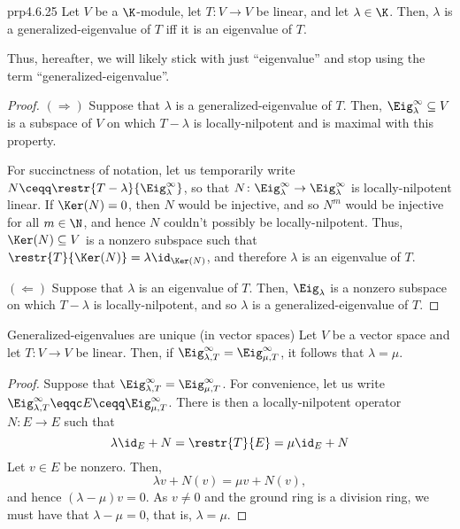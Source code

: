 \begin{prp}{}{prp4.6.25}
	Let $V$ be a $\K$-module, let $T\colon V\rightarrow V$ be linear, and let $\lambda \in \K$.  Then, $\lambda$ is a generalized-eigenvalue of $T$ iff it is an eigenvalue of $T$.
	\begin{rmk}
		Thus, hereafter, we will likely stick with just ``eigenvalue'' and stop using the term ``generalized-eigenvalue''.
	\end{rmk}
	\begin{proof}
		$(\Rightarrow )$ Suppose that $\lambda$ is a generalized-eigenvalue of $T$.  Then, $\Eig _{\lambda}^{\infty}\subseteq V$ is a subspace of $V$ on which $T-\lambda$ is locally-nilpotent and is maximal with this property.
		
		For succinctness of notation, let us temporarily write $N\ceqq \restr{T-\lambda}{\Eig _{\lambda}^{\infty}}$, so that $N\colon \Eig _{\lambda}^{\infty}\rightarrow \Eig _{\lambda}^{\infty}$ is locally-nilpotent linear.  If $\Ker (N)=0$, then $N$ would be injective, and so $N^m$ would be injective for all $m\in \N$, and hence $N$ couldn't possibly be locally-nilpotent.  Thus, $\Ker (N)\subseteq V$ is a nonzero subspace such that $\restr{T}{\Ker (N)}=\lambda \id _{\Ker (N)}$, and therefore $\lambda$ is an eigenvalue of $T$.
		
		\blni
		$(\Leftarrow )$ Suppose that $\lambda$ is an eigenvalue of $T$.  Then, $\Eig _{\lambda}$ is a nonzero subspace on which $T-\lambda$ is locally-nilpotent, and so $\lambda$ is a generalized-eigenvalue of $T$.
	\end{proof}
\end{prp}
\begin{prp}{Generalized-eigenvalues are u\-nique (in vector spaces)}{}
	Let $V$ be a vector space and let $T\colon V\rightarrow V$ be linear.  Then, if $\Eig _{\lambda ,T}^{\infty}=\Eig _{\mu ,T}^{\infty}$, it follows that $\lambda =\mu$.
	\begin{proof}
		Suppose that $\Eig _{\lambda ,T}^{\infty}=\Eig _{\mu ,T}^{\infty}$.  For convenience, let us write $\Eig _{\lambda ,T}^{\infty}\eqqc E\ceqq \Eig _{\mu ,T}^{\infty}$.  There is then a locally-nilpotent operator $N\colon E\rightarrow E$ such that
		\begin{equation}
			\lambda \id _E+N=\restr{T}{E}=\mu \id _E+N
		\end{equation}
		Let $v\in E$ be nonzero.  Then,
		\begin{equation}
			\lambda v+N(v)=\mu v+N(v),
		\end{equation}
		and hence $(\lambda -\mu )v=0$.  As $v\neq 0$ and the ground ring is a division ring, we must have that $\lambda -\mu =0$, that is, $\lambda =\mu$.
	\end{proof}
\end{prp}
